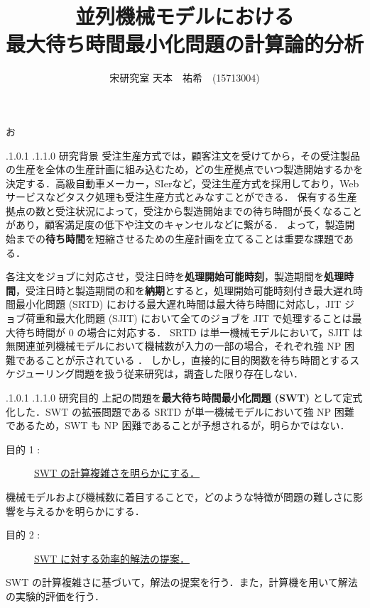 お\documentclass[oneside, 10pt, twocolumn]{jarticle}
\title{\bf{\rm
並列機械モデルにおける\\最大待ち時間最小化問題の計算論的分析}}
\author{宋研究室
\hspace{15pt}
天本　祐希　(15713004)}
\date{}
\makeatletter
\def\section{\@startsection {section}{1}{\z@}{-3.5ex plus -1ex minus
-.2ex}{2.3 ex plus .2ex}{\large\bf}}
\renewcommand{\section}{
\@startsection{section}{1}{\z@}
{.1\Cvs \@plus.0\Cdp \@minus.1\Cdp}%
{.1\Cvs \@plus.1\Cdp \@minus.0\Cdp}%
{\reset@font\large\bfseries}}      %
\makeatother
\begin{document}
\maketitle
\thispagestyle{empty}
\section{研究背景}
受注生産方式では，顧客注文を受けてから，その受注製品の生産を全体の生産計画に組み込むため，どの生産拠点でいつ製造開始するかを決定する．高級自動車メーカー，SIerなど，受注生産方式を採用しており，Web サービスなどタスク処理も受注生産方式とみなすことができる．
保有する生産拠点の数と受注状況によって，受注から製造開始までの待ち時間が長くなることがあり，顧客満足度の低下や注文のキャンセルなどに繋がる．
よって，製造開始までの{\bf 待ち時間}を短縮させるための生産計画を立てることは重要な課題である．

各注文をジョブに対応させ，受注日時を{\bf 処理開始可能時刻}，製造期間を{\bf 処理時間}，受注日時と製造期間の和を{\bf 納期}とすると，処理開始可能時刻付き最大遅れ時間最小化問題 (SRTD) における最大遅れ時間は最大待ち時間に対応し，JIT ジョブ荷重和最大化問題 (SJIT) において全てのジョブを JIT で処理することは最大待ち時間が 0 の場合に対応する． SRTD は単一機械モデルにおいて，SJIT は無関連並列機械モデルにおいて機械数が入力の一部の場合，それぞれ強 NP 困難であることが示されている \cite{SRTD}\cite{SJIT}．
しかし，直接的に目的関数を待ち時間とするスケジューリング問題を扱う従来研究は，調査した限り存在しない．

\section{研究目的}
上記の問題を{\bf 最大待ち時間最小化問題 (SWT) }として定式化した．SWT の拡張問題である SRTD が単一機械モデルにおいて強 NP  困難であるため，SWT も NP 困難であることが予想されるが，明らかではない．
\begin{description}
  \item[目的 1 :]
  \underline{SWT の計算複雑さを明らかにする．}
\end{description}
機械モデルおよび機械数に着目することで，どのような特徴が問題の難しさに影響を与えるかを明らかにする．

\begin{description}
  \item[目的 2 :]
  \underline{SWT に対する効率的解法の提案．}
\end{description}
SWT の計算複雑さに基づいて，解法の提案を行う．また，計算機を用いて解法の実験的評価を行う．
\end{document}
